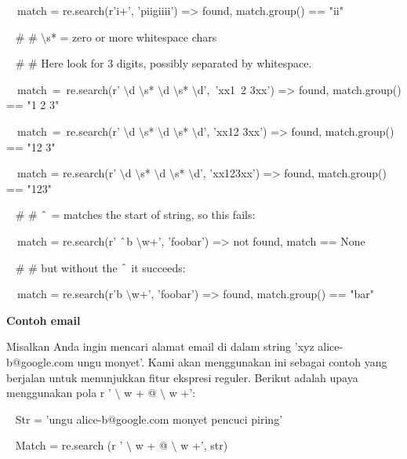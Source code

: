\begin {enumerate}
\noindent 
~~match = re.search(r'i+', 'piigiiii') =>  found, match.group() == "ii" \par
\vspace{12pt}
\noindent 
~  $  \#  $ $  \#  $  $  \setminus  $s* = zero or more whitespace chars \par
\noindent 
~  $  \#  $ $  \#  $ Here look for 3 digits, possibly separated by whitespace. \par
\noindent 
~~match~=~re.search(r' $  \setminus  $d $  \setminus  $s* $  \setminus  $d $  \setminus  $s* $  \setminus  $d',~'xx1~2   3xx') =>  found, match.group() == "1 2   3" \par
\noindent 
~~match~=~re.search(r' $  \setminus  $d $  \setminus  $s* $  \setminus  $d $  \setminus  $s* $  \setminus  $d', 'xx12  3xx') =>  found, match.group() == "12  3" \par
\noindent 
~~match = re.search(r' $  \setminus  $d $  \setminus  $s* $  \setminus  $d $  \setminus  $s* $  \setminus  $d', 'xx123xx') =>  found, match.group() == "123" \par
\vspace{12pt}
\noindent 
~  $  \#  $ $  \#  $  $  \string^  $ = matches the start of string, so this fails: \par
\noindent 
~~match = re.search(r' $  \string^  $b $  \setminus  $w+', 'foobar') =>  not found, match == None \par
\noindent 
~  $  \#  $ $  \#  $ but without the  $  \string^  $ it succeeds: \par
\noindent 
~~match = re.search(r'b $  \setminus  $w+', 'foobar') =>  found, match.group() == "bar" \par
\vspace{12pt}
\vspace{12pt}
\noindent 
{\fontsize{14pt}{14pt}\selectfont \textbf{Contoh email} \\} \par
Misalkan Anda ingin mencari alamat email di dalam string 'xyz alice-b@google.com ungu monyet'. Kami akan menggunakan ini sebagai contoh yang berjalan untuk menunjukkan fitur ekspresi reguler. Berikut adalah upaya menggunakan pola r ' $  \setminus  $ w + @  $  \setminus  $ w +': \par
\vspace{12pt}
\noindent 
~ Str = 'ungu alice-b@google.com monyet pencuci piring' \par
\noindent 
~ Match = re.search (r ' $  \setminus  $ w + @  $  \setminus  $ w +', str) \par
\noindent 

\end{enumerate}
